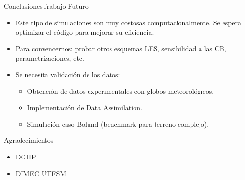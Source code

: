 \documentclass[mathserif]{beamer}
\begin{document}
\begin{frame}{Conclusiones}{Trabajo Futuro}
	\begin{itemize}\justifying
		\item Este tipo de simulaciones son muy costosas computacionalmente. Se espera optimizar el código para mejorar su eficiencia.
		\item Para convencernos: probar otros esquemas LES, sensibilidad a las CB, parametrizaciones, etc.
		\item Se necesita validación de los datos:
		\begin{itemize}
			\item Obtención de datos experimentales con globos meteorológicos.
			\item Implementación de Data Assimilation.
			\item Simulación caso Bolund (benchmark para terreno complejo).
		\end{itemize}
	\end{itemize}
\end{frame}

\begin{frame}{Agradecimientos}
	\begin{itemize}\justifying
		\item DGIIP
		\item DIMEC UTFSM
	\end{itemize}
\end{frame}

\begin{frame}
  \titlepage
\end{frame}
\end{document}
